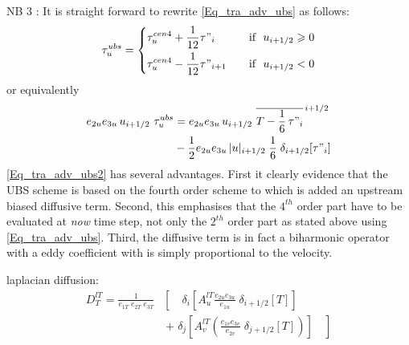 \documentclass[NEMO_book]{subfiles}
\begin{document}
NB 3 : It is straight forward to rewrite \eqref{Eq_tra_adv_ubs} as follows:
\begin{equation} \label{Eq_tra_adv_ubs2}
\tau _u^{ubs} = \left\{	 \begin{aligned}
	& \tau _u^{cen4} + \frac{1}{12} \tau"_i		& \quad \text{if }\ u_{i+1/2} \geqslant 0 \\
	& \tau _u^{cen4} - \frac{1}{12} \tau"_{i+1}	& \quad \text{if }\ u_{i+1/2}       <       0
  						 \end{aligned}    \right.
\end{equation}
or equivalently 
\begin{equation} \label{Eq_tra_adv_ubs2}
\begin{split}
e_{2u} e_{3u}\,u_{i+1/2} \ \tau _u^{ubs} 
&= e_{2u} e_{3u}\,u_{i+1/2} \ \overline{ T - \frac{1}{6}\,\tau"_i }^{\,i+1/2} \\
& - \frac{1}{2} e_{2u} e_{3u}\,|u|_{i+1/2} \;\frac{1}{6} \;\delta_{i+1/2}[\tau"_i]
\end{split}
\end{equation}
\eqref{Eq_tra_adv_ubs2} has several advantages. First it clearly evidence that 
the UBS scheme is based on the fourth order scheme to which is added an 
upstream biased diffusive term. Second, this emphasises that the $4^{th}$ order 
part have to be evaluated at \emph{now} time step, not only the $2^{th}$ order 
part as stated above using \eqref{Eq_tra_adv_ubs}. Third, the diffusive term is 
in fact a biharmonic operator with a eddy coefficient with is simply proportional 
to the velocity.

laplacian diffusion:
\begin{equation} \label{Eq_tra_ldf_lap}
\begin{split}
D_T^{lT} =\frac{1}{e_{1T} \; e_{2T}\;  e_{3T} } &\left[ {\quad \delta _i 
\left[ {A_u^{lT} \frac{e_{2u} e_{3u} }{e_{1u} }\;\delta _{i+1/2} 
\left[ T \right]} \right]} \right.
\\
&\ \left. {+\; \delta _j \left[ 
{A_v^{lT} \left( {\frac{e_{1v} e_{3v} }{e_{2v} }\;\delta _{j+1/2} \left[ T 
\right]} \right)} \right]\quad } \right]
\end{split}
\end{equation}
\end{document}
